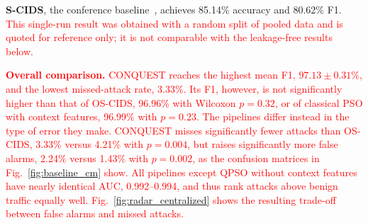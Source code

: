 \documentclass[conference]{IEEEtran}
\begin{document}
\begin{table}[!t]
\centering
\caption{\textcolor{red}{Centralized detection over ten seeds, with Wilcoxon p-values against CONQUEST. \textsuperscript{\textdagger}Conference result~\cite{ajakweconquest}, not directly comparable.}}
\label{tab:cyberworm_high_impact}
\color{red}
\setlength{\tabcolsep}{3pt}
\end{table}

\textbf{S-CIDS}, the conference baseline~\cite{ajakweconquest},
achieves 85.14\% accuracy and 80.62\% F1. \textcolor{red}{This single-run result was
obtained with a random split of pooled data and is quoted for
reference only; it is not comparable with the leakage-free results
below.}



\textcolor{red}{\textbf{Overall comparison.}
CONQUEST reaches the highest mean F1, $97.13\pm0.31\%$, and the lowest
missed-attack rate, 3.33\%. Its F1, however, is not significantly
higher than that of OS-CIDS, 96.96\% with Wilcoxon $p=0.32$, or of
classical PSO with context features, 96.99\% with $p=0.23$. The
pipelines differ instead in the type of error they make. CONQUEST
misses significantly fewer attacks than OS-CIDS, 3.33\% versus 4.21\%
with $p=0.004$, but raises significantly more false alarms, 2.24\%
versus 1.43\% with $p=0.002$, as the confusion matrices in
Fig.~\ref{fig:baseline_cm} show. All pipelines except QPSO without
context features have nearly identical AUC, 0.992--0.994, and thus
rank attacks above benign traffic equally well.
Fig.~\ref{fig:radar_centralized} shows the resulting trade-off between
false alarms and missed attacks.}
\end{document}
